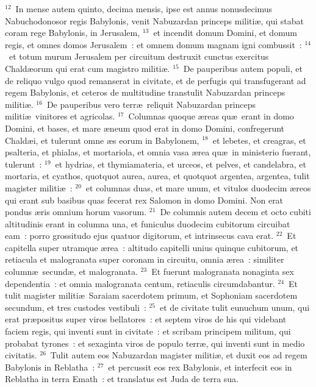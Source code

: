 ${}^{12}$~In mense autem quinto, decima mensis, ipse est annus nonusdecimus Nabuchodonosor regis Babylonis, venit Nabuzardan princeps militi\ae , qui stabat coram rege Babylonis, in Jerusalem,
${}^{13}$~et incendit domum Domini, et domum regis, et omnes domos Jerusalem~: et omnem domum magnam igni combussit~:
${}^{14}$~et totum murum Jerusalem per circuitum destruxit cunctus exercitus Chald\ae orum qui erat cum magistro militi\ae .
${}^{15}$~De pauperibus autem populi, et de reliquo vulgo quod remanserat in civitate, et de perfugis qui transfugerant ad regem Babylonis, et ceteros de multitudine transtulit Nabuzardan princeps militi\ae .
${}^{16}$~De pauperibus vero terr\ae\ reliquit Nabuzardan princeps militi\ae\ vinitores et agricolas.
${}^{17}$~Columnas quoque \ae reas qu\ae\ erant in domo Domini, et bases, et mare \ae neum quod erat in domo Domini, confregerunt Chald\ae i, et tulerunt omne \ae s eorum in Babylonem,
${}^{18}$~et lebetes, et creagras, et psalteria, et phialas, et mortariola, et omnia vasa \ae rea qu\ae\ in ministerio fuerant, tulerunt~:
${}^{19}$~et hydrias, et thymiamateria, et urceos, et pelves, et candelabra, et mortaria, et cyathos, quotquot aurea, aurea, et quotquot argentea, argentea, tulit magister militi\ae~:
${}^{20}$~et columnas duas, et mare unum, et vitulos duodecim \ae reos qui erant sub basibus quas fecerat rex Salomon in domo Domini. Non erat pondus \ae ris omnium horum vasorum.
${}^{21}$~De columnis autem decem et octo cubiti altitudinis erant in columna una, et funiculus duodecim cubitorum circuibat eam~: porro grossitudo ejus quatuor digitorum, et intrinsecus cava erat.
${}^{22}$~Et capitella super utramque \ae rea~: altitudo capitelli unius quinque cubitorum, et retiacula et malogranata super coronam in circuitu, omnia \ae rea~: similiter column\ae\ secund\ae , et malogranata.
${}^{23}$~Et fuerunt malogranata nonaginta sex dependentia~: et omnia malogranata centum, retiaculis circumdabantur.
${}^{24}$~Et tulit magister militi\ae\ Saraiam sacerdotem primum, et Sophoniam sacerdotem secundum, et tres custodes vestibuli~:
${}^{25}$~et de civitate tulit eunuchum unum, qui erat pr\ae positus super viros bellatores~: et septem viros de his qui videbant faciem regis, qui inventi sunt in civitate~: et scribam principem militum, qui probabat tyrones~: et sexaginta viros de populo terr\ae , qui inventi sunt in medio civitatis.
${}^{26}$~Tulit autem eos Nabuzardan magister militi\ae , et duxit eos ad regem Babylonis in Reblatha~:
${}^{27}$~et percussit eos rex Babylonis, et interfecit eos in Reblatha in terra Emath~: et translatus est Juda de terra sua.
